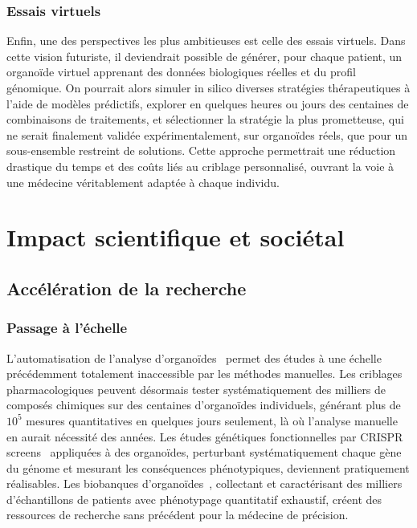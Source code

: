 \subsubsection{Essais virtuels}

Enfin, une des perspectives les plus ambitieuses est celle des essais virtuels. Dans cette vision futuriste, il deviendrait possible de générer, pour chaque patient, un organoïde virtuel apprenant des données biologiques réelles et du profil génomique. On pourrait alors simuler in silico diverses stratégies thérapeutiques à l’aide de modèles prédictifs, explorer en quelques heures ou jours des centaines de combinaisons de traitements, et sélectionner la stratégie la plus prometteuse, qui ne serait finalement validée expérimentalement, sur organoïdes réels, que pour un sous-ensemble restreint de solutions. Cette approche permettrait une réduction drastique du temps et des coûts liés au criblage personnalisé, ouvrant la voie à une médecine véritablement adaptée à chaque individu.

\section{Impact scientifique et sociétal}

\subsection{Accélération de la recherche}

\subsubsection{Passage à l'échelle}

L'automatisation de l'analyse d'organoïdes~\cite{Kassis2019,Matthews2022} permet des études à une échelle précédemment totalement inaccessible par les méthodes manuelles. Les criblages pharmacologiques peuvent désormais tester systématiquement des milliers de composés chimiques sur des centaines d'organoïdes individuels, générant plus de $10^5$ mesures quantitatives en quelques jours seulement, là où l'analyse manuelle en aurait nécessité des années. Les études génétiques fonctionnelles par CRISPR screens~\cite{Dekkers2013,Boj2015} appliquées à des organoïdes, perturbant systématiquement chaque gène du génome et mesurant les conséquences phénotypiques, deviennent pratiquement réalisables. Les biobanques d'organoïdes~\cite{Sachs2018}, collectant et caractérisant des milliers d'échantillons de patients avec phénotypage quantitatif exhaustif, créent des ressources de recherche sans précédent pour la médecine de précision.

